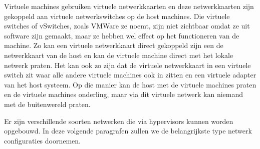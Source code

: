 Virtuele machines gebruiken virtuele netwerkkaarten en deze netwerkkaarten zijn gekoppeld aan virtuele netwerkswitches op de host machines. Die virtuele switches of vSwitches, zoals VMWare ze noemt, zijn niet zichtbaar omdat ze uit software zijn gemaakt, maar ze hebben wel effect op het functioneren van de machine. Zo kan een virtuele netwerkkaart direct gekoppeld zijn een de netwerkkaart van de host en kan de virtuele machine direct met het lokale netwerk praten. Het kan ook zo zijn dat de virtuele netwerkkaart in een virtuele switch zit waar alle andere virtuele machines ook in zitten en een virtuele adapter van het host systeem. Op die manier kan de host met de virtuele machines praten en de virtuele machines onderling, maar via dit virtuele netwerk kan niemand met de buitenwereld praten.

Er zijn verschillende soorten netwerken die via hypervisors kunnen worden opgebouwd. In deze volgende paragrafen zullen we de belangrijkste type netwerk configuraties doornemen.
